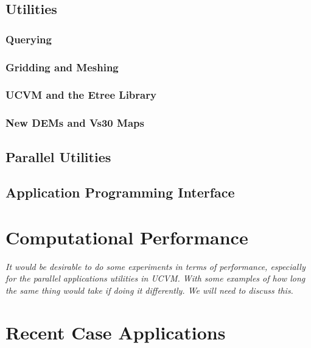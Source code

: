 








\subsection{Utilities}

\subsubsection{Querying}

\subsubsection{Gridding and Meshing}

\subsubsection{UCVM and the Etree Library}

\subsubsection{New DEMs and Vs30 Maps}

\subsection{Parallel Utilities}

\subsection{Application Programming Interface}


\section{Computational Performance}
\label{sec:conclusions}

\textit{
\color{blue}
It would be desirable to do some experiments in terms of performance, especially for the parallel applications utilities in UCVM. With some examples of how long the same thing would take if doing it differently. We will need to discuss this.
}

\section{Recent Case Applications}
\label{sec:conclusions}


